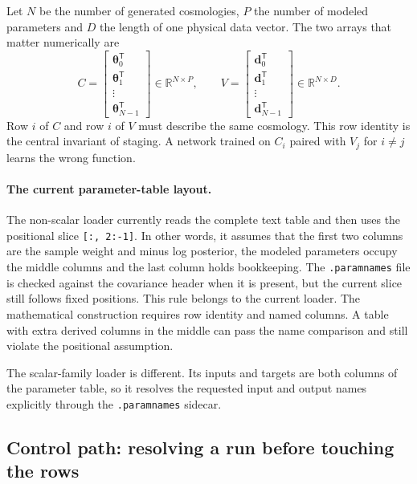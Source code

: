 \documentclass[10pt,aps,prd,twocolumn,nofootinbib]{revtex4-2}
\newcommand{\code}[1]{\texttt{#1}}
\newcommand{\btheta}{\boldsymbol{\theta}}
\newcommand{\bd}{\mathbf{d}}
\begin{document}
Let $N$ be the number of generated cosmologies, $P$ the number of modeled
parameters and $D$ the length of one physical data vector.  The two arrays
that matter numerically are
\begin{equation}
  C =
  \begin{bmatrix}
    \btheta_0^{\mathsf T} \\
    \btheta_1^{\mathsf T} \\
    \vdots \\
    \btheta_{N-1}^{\mathsf T}
  \end{bmatrix}
  \in \mathbb{R}^{N\times P},
  \qquad
  V =
  \begin{bmatrix}
    \bd_0^{\mathsf T} \\
    \bd_1^{\mathsf T} \\
    \vdots \\
    \bd_{N-1}^{\mathsf T}
  \end{bmatrix}
  \in \mathbb{R}^{N\times D}.
  \label{eq:raw-arrays}
\end{equation}
Row $i$ of $C$ and row $i$ of $V$ must describe the same cosmology.  This
row identity is the central invariant of staging.  A network trained on
$C_i$ paired with $V_j$ for $i\ne j$ learns the wrong function.

\paragraph{The current parameter-table layout.}
The non-scalar loader currently reads the complete text table and then uses
the positional slice \code{[:, 2:-1]}.  In other words, it assumes that the
first two columns are the sample weight and minus log posterior, the modeled
parameters occupy the middle columns and the last column holds bookkeeping.
The \code{.paramnames} file is checked against the covariance header when it is
present, but the current slice still follows fixed positions.  This rule
belongs to the current loader.  The mathematical construction requires row
identity and named columns.  A table with extra derived columns in the middle
can pass the name comparison and still violate the positional assumption.

The scalar-family loader is different.  Its inputs and targets are both
columns of the parameter table, so it resolves the requested input and output
names explicitly through the \code{.paramnames} sidecar.

\subsection{Control path: resolving a run before touching the rows}
\end{document}
